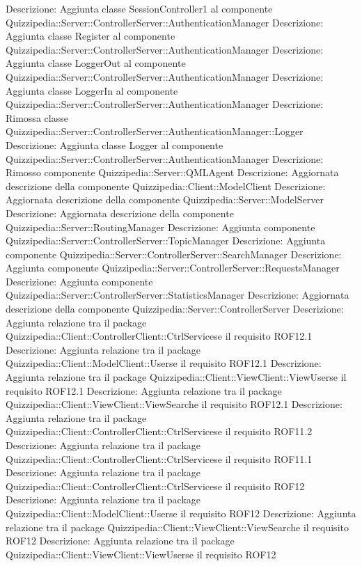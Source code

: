 Descrizione: Aggiunta classe SessionController1 al componente Quizzipedia::Server::ControllerServer::AuthenticationManager 
Descrizione: Aggiunta classe Register al componente Quizzipedia::Server::ControllerServer::AuthenticationManager 
Descrizione: Aggiunta classe LoggerOut al componente Quizzipedia::Server::ControllerServer::AuthenticationManager 
Descrizione: Aggiunta classe LoggerIn al componente Quizzipedia::Server::ControllerServer::AuthenticationManager 
Descrizione: Rimossa classe Quizzipedia::Server::ControllerServer::AuthenticationManager::Logger 
Descrizione: Aggiunta classe Logger al componente Quizzipedia::Server::ControllerServer::AuthenticationManager 
Descrizione: Rimosso componente Quizzipedia::Server::QMLAgent 
Descrizione: Aggiornata descrizione della componente Quizzipedia::Client::ModelClient 
Descrizione: Aggiornata descrizione della componente Quizzipedia::Server::ModelServer 
Descrizione: Aggiornata descrizione della componente Quizzipedia::Server::RoutingManager 
Descrizione: Aggiunta componente Quizzipedia::Server::ControllerServer::TopicManager 
Descrizione: Aggiunta componente Quizzipedia::Server::ControllerServer::SearchManager 
Descrizione: Aggiunta componente Quizzipedia::Server::ControllerServer::RequestsManager 
Descrizione: Aggiunta componente Quizzipedia::Server::ControllerServer::StatisticsManager 
Descrizione: Aggiornata descrizione della componente Quizzipedia::Server::ControllerServer 
Descrizione: Aggiunta relazione tra il package Quizzipedia::Client::ControllerClient::CtrlServicese il requisito ROF12.1 
Descrizione: Aggiunta relazione tra il package Quizzipedia::Client::ModelClient::Userse il requisito ROF12.1 
Descrizione: Aggiunta relazione tra il package Quizzipedia::Client::ViewClient::ViewUserse il requisito ROF12.1 
Descrizione: Aggiunta relazione tra il package Quizzipedia::Client::ViewClient::ViewSearche il requisito ROF12.1 
Descrizione: Aggiunta relazione tra il package Quizzipedia::Client::ControllerClient::CtrlServicese il requisito ROF11.2 
Descrizione: Aggiunta relazione tra il package Quizzipedia::Client::ControllerClient::CtrlServicese il requisito ROF11.1 
Descrizione: Aggiunta relazione tra il package Quizzipedia::Client::ControllerClient::CtrlServicese il requisito ROF12 
Descrizione: Aggiunta relazione tra il package Quizzipedia::Client::ModelClient::Userse il requisito ROF12 
Descrizione: Aggiunta relazione tra il package Quizzipedia::Client::ViewClient::ViewSearche il requisito ROF12 
Descrizione: Aggiunta relazione tra il package Quizzipedia::Client::ViewClient::ViewUserse il requisito ROF12 
